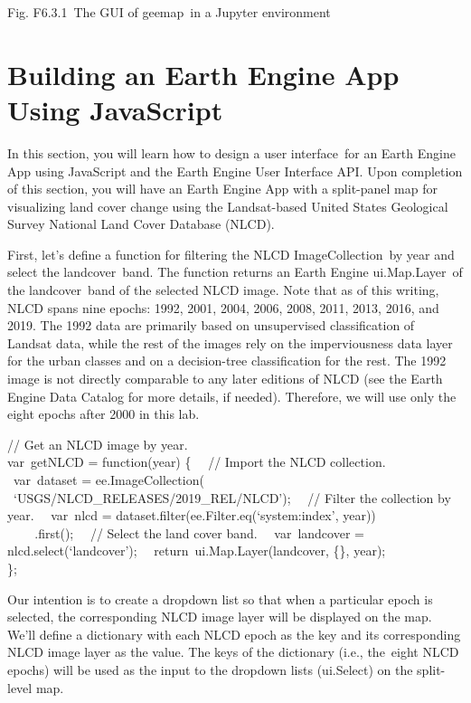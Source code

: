 \documentclass[
  letterpaper,
  DIV=11,
  numbers=noendperiod]{scrreprt}
\begin{document}
Fig. F6.3.1~The GUI of geemap~in a Jupyter environment

\hypertarget{building-an-earth-engine-app-using-javascript}{%
\section{Building an Earth Engine App Using
JavaScript}\label{building-an-earth-engine-app-using-javascript}}

In this section, you will learn how to design a user interface~for an
Earth Engine App using JavaScript and the Earth Engine User Interface
API. Upon completion of this section, you will have an Earth Engine App
with a split-panel map for visualizing land cover change using the
Landsat-based United States Geological Survey National Land Cover
Database (NLCD).

First, let's define a function for filtering the NLCD ImageCollection~by
year and select the landcover~band. The function returns an Earth Engine
ui.Map.Layer~of the landcover~band of the selected NLCD image. Note that
as of this writing, NLCD spans nine epochs: 1992, 2001, 2004, 2006,
2008, 2011, 2013, 2016, and 2019. The 1992 data are primarily based on
unsupervised classification of Landsat data, while the rest of the
images rely on the imperviousness data layer for the urban classes and
on a decision-tree classification for the rest. The 1992 image is not
directly comparable to any later editions of NLCD (see the Earth Engine
Data Catalog for more details, if needed). Therefore, we will use only
the eight epochs after 2000 in this lab. ~

// Get an NLCD image by year.\\
var~getNLCD = function(year) \{~ ~// Import the NLCD collection.~
~var~dataset = ee.ImageCollection(~ ~ ~
~`USGS/NLCD\_RELEASES/2019\_REL/NLCD');~ ~// Filter the collection by
year.~ ~var~nlcd = dataset.filter(ee.Filter.eq(`system:index', year))\\
\hspace*{0.333em} ~ ~ ~.first();~ ~// Select the land cover band.~
~var~landcover = nlcd.select(`landcover');~
~return~ui.Map.Layer(landcover, \{\}, year);\\
\};

Our intention is to create a dropdown list so that when a particular
epoch is selected, the corresponding NLCD image layer will be displayed
on the map. We'll define a dictionary with each NLCD epoch as the key
and its corresponding NLCD image layer as the value. The keys of the
dictionary (i.e., the~eight NLCD epochs) will be used as the input to
the dropdown lists (ui.Select) on the split-level map.
\end{document}
